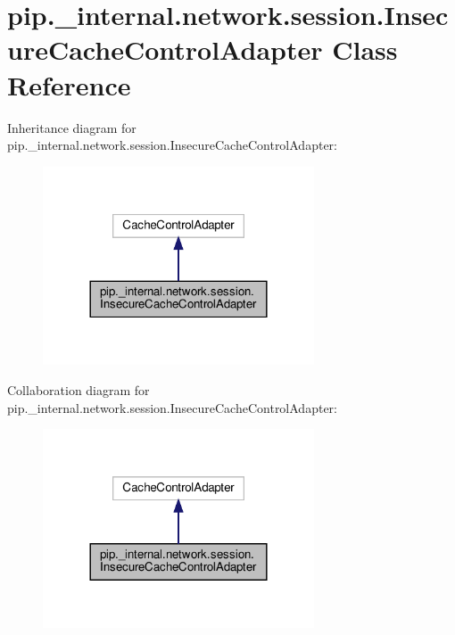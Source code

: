 \hypertarget{classpip_1_1__internal_1_1network_1_1session_1_1InsecureCacheControlAdapter}{}\section{pip.\+\_\+internal.\+network.\+session.\+Insecure\+Cache\+Control\+Adapter Class Reference}
\label{classpip_1_1__internal_1_1network_1_1session_1_1InsecureCacheControlAdapter}


Inheritance diagram for pip.\+\_\+internal.\+network.\+session.\+Insecure\+Cache\+Control\+Adapter\+:
\nopagebreak
\begin{figure}[H]
\begin{center}
\leavevmode
\includegraphics[width=228pt]{classpip_1_1__internal_1_1network_1_1session_1_1InsecureCacheControlAdapter__inherit__graph}
\end{center}
\end{figure}


Collaboration diagram for pip.\+\_\+internal.\+network.\+session.\+Insecure\+Cache\+Control\+Adapter\+:
\nopagebreak
\begin{figure}[H]
\begin{center}
\leavevmode
\includegraphics[width=228pt]{classpip_1_1__internal_1_1network_1_1session_1_1InsecureCacheControlAdapter__coll__graph}
\end{center}
\end{figure}
